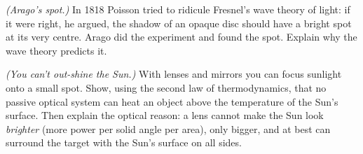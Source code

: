 \begin{problems}
 \emph{(Arago's spot.)} In 1818 Poisson tried to ridicule Fresnel's wave theory of light: if it were right, he argued, the shadow of an opaque disc should have a bright spot at its very centre. Arago did the experiment and found the spot. Explain why the wave theory predicts it.

 \emph{(You can't out-shine the Sun.)} With lenses and mirrors you can focus sunlight onto a small spot. Show, using the second law of thermodynamics, that no passive optical system can heat an object above the temperature of the Sun's surface. Then explain the optical reason: a lens cannot make the Sun look \emph{brighter} (more power per solid angle per area), only bigger, and at best can surround the target with the Sun's surface on all sides.
\end{problems}

\begin{reading}
\end{reading}
